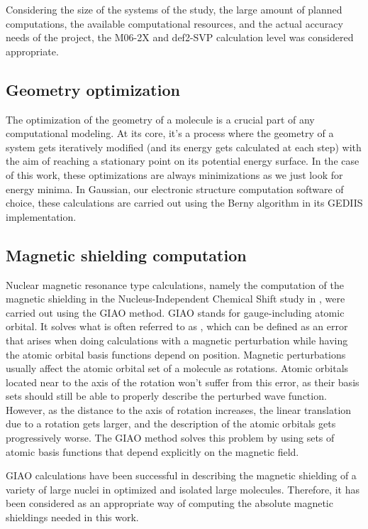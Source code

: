Considering the size of the systems of the study, the large amount of planned computations, the available computational resources, and the actual accuracy needs of the project, the M06-2X and def2-SVP calculation level was considered appropriate.

\subsection{Geometry optimization}
The optimization of the geometry of a molecule is a crucial part of any computational modeling.
At its core, it's a process where the geometry of a system gets iteratively modified (and its energy gets calculated at each step) with the aim of reaching a stationary point on its potential energy surface.
In the case of this work, these optimizations are always minimizations as we just look for energy minima.
In Gaussian, our electronic structure computation software of choice, these calculations are carried out using the Berny algorithm in its GEDIIS implementation.

\subsection{Magnetic shielding computation}
Nuclear magnetic resonance type calculations, namely the computation of the magnetic shielding in the Nucleus-Independent Chemical Shift study in , were carried out using the GIAO method.
GIAO stands for gauge-including atomic orbital.
It solves what is often referred to as , which can be defined as an error that arises when doing calculations with a magnetic perturbation while having the atomic orbital basis functions depend on position.
Magnetic perturbations usually affect the atomic orbital set of a molecule as rotations.
Atomic orbitals located near to the axis of the rotation won't suffer from this error, as their basis sets should still be able to properly describe the perturbed wave function.
However, as the distance to the axis of rotation increases, the linear translation due to a rotation gets larger, and the description of the atomic orbitals gets progressively worse.
The GIAO method solves this problem by using sets of atomic basis functions that depend explicitly on the magnetic field.

GIAO calculations have been successful in describing the magnetic shielding of a variety of large nuclei in optimized and isolated large molecules. Therefore, it has been considered as an appropriate way of computing the absolute magnetic shieldings needed in this work.

